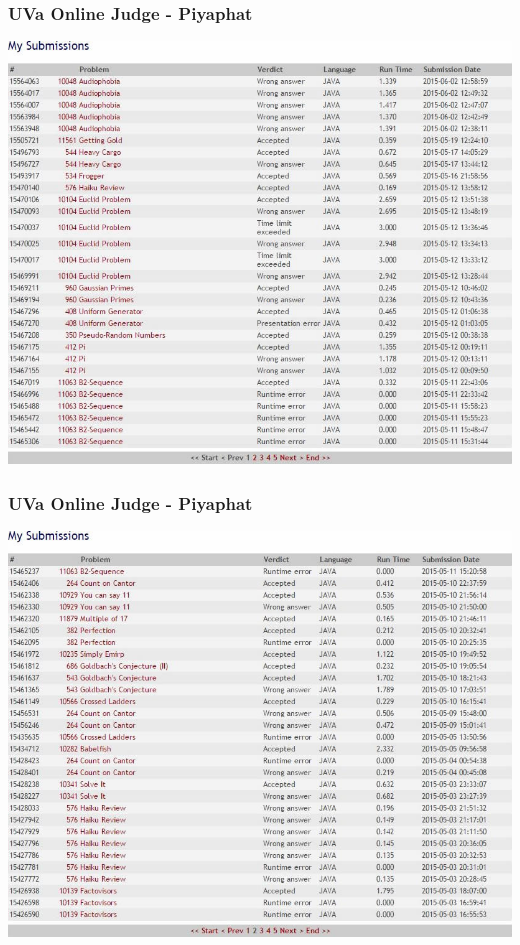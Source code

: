 \documentclass{beamer}
\begin{document}
			\begin{frame}
				\frametitle{UVa Online Judge - Piyaphat}
				\begin{center}
					\includegraphics[scale=0.4]{Submission1-1} 
				\end{center}
			\end{frame}

			\begin{frame}
				\frametitle{UVa Online Judge - Piyaphat}
				\begin{center}
					\includegraphics[scale=0.4]{Submission1-2} 
				\end{center}
			\end{frame}
\end{document}
